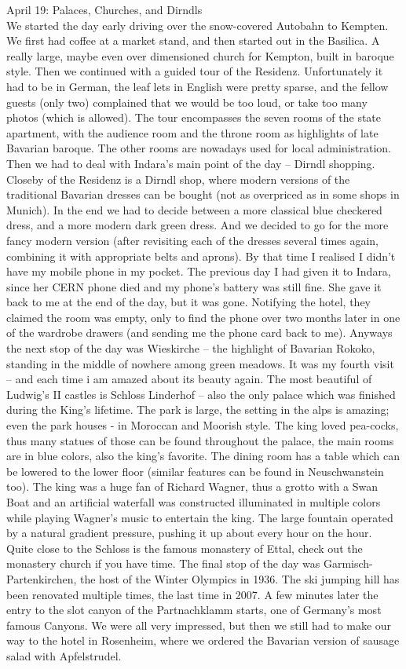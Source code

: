 April 19: Palaces, Churches, and Dirndls\\
We started the day early driving over the snow-covered Autobahn to Kempten. We first had coffee at a market stand, and then started out in the Basilica. A really large, maybe even over dimensioned church for Kempton, built in baroque style. Then we continued with a guided tour of the Residenz. Unfortunately it had to be in German, the leaf lets in English were pretty sparse, and the fellow guests (only two) complained that we would be too loud, or take too many photos (which is allowed). The tour encompasses the seven rooms of the state apartment, with the audience room and the throne room as highlights of late Bavarian baroque. The other rooms are nowadays used for local administration. Then we had to deal with Indara's main point of the day -- Dirndl shopping. Closeby of the Residenz is a Dirndl shop, where modern versions of the traditional Bavarian dresses can be bought (not as overpriced as in some shops in Munich). In the end we had to decide between a more classical blue checkered dress, and a more modern dark green dress. And we decided to go for the more fancy modern version (after revisiting each of the dresses several times again, combining it with appropriate belts and aprons). By that time I realised I didn't have my mobile phone in my pocket. The previous day I had given it to Indara, since her CERN phone died and my phone's battery was still fine. She gave it back to me at the end of the day, but it was gone. Notifying the hotel, they claimed the room was empty, only to find the phone over two months later in one of the wardrobe drawers (and sending me the phone card back to me). Anyways the next stop of the day was Wieskirche -- the highlight of Bavarian Rokoko, standing in the middle of nowhere among green meadows. It was my fourth visit -- and each time i am amazed about its beauty again. The most beautiful of Ludwig's II castles is Schloss Linderhof -- also the only palace which was finished during the King's lifetime. The park is large, the setting in the alps is amazing; even the park houses - in Moroccan and Moorish style. The king loved pea-cocks, thus many statues of those can be found throughout the palace, the main rooms are in blue colors, also the king's favorite. The dining room has a table which can be lowered to the lower floor (similar features can be found in Neuschwanstein too). The king was a huge fan of Richard Wagner, thus a grotto with a Swan Boat and an artificial waterfall was constructed illuminated in multiple colors while playing Wagner's music to entertain the king. The large fountain operated by a natural gradient pressure, pushing it up about every hour on the hour. Quite close to the Schloss is the famous monastery of Ettal, check out the monastery church if you have time. The final stop of the day was Garmisch-Partenkirchen, the host of the Winter Olympics in 1936. The ski jumping hill has been renovated multiple times, the last time in 2007. A few minutes later the entry to the slot canyon of the Partnachklamm starts, one of Germany's most famous Canyons. We were all very impressed, but then we still had to make our way to the hotel in Rosenheim, where we ordered the Bavarian version of sausage salad with Apfelstrudel.\\

